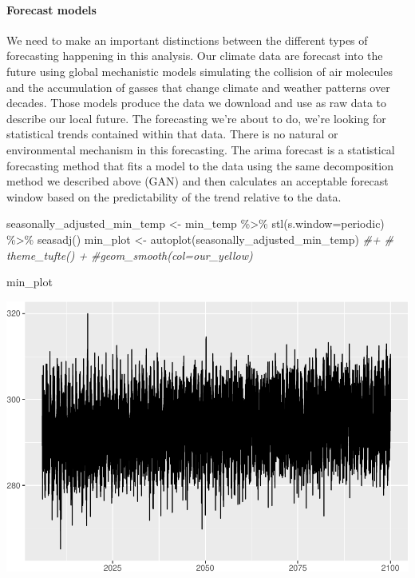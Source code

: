 \documentclass[
  paper=a4,
  ,captions=tableheading
]{scrartcl}
\newenvironment{Shaded}{\begin{snugshade}}{\end{snugshade}}
\newcommand{\AttributeTok}[1]{\textcolor[rgb]{0.77,0.63,0.00}{#1}}
\newcommand{\CommentTok}[1]{\textcolor[rgb]{0.56,0.35,0.01}{\textit{#1}}}
\newcommand{\FunctionTok}[1]{\textcolor[rgb]{0.00,0.00,0.00}{#1}}
\newcommand{\NormalTok}[1]{#1}
\newcommand{\OtherTok}[1]{\textcolor[rgb]{0.56,0.35,0.01}{#1}}
\newcommand{\SpecialCharTok}[1]{\textcolor[rgb]{0.00,0.00,0.00}{#1}}
\newcommand{\StringTok}[1]{\textcolor[rgb]{0.31,0.60,0.02}{#1}}
\begin{document}
\hypertarget{forecast-models}{%
\paragraph{Forecast models}\label{forecast-models}}

We need to make an important distinctions between the different types of
forecasting happening in this analysis. Our climate data are forecast
into the future using global mechanistic models simulating the collision
of air molecules and the accumulation of gasses that change climate and
weather patterns over decades. Those models produce the data we download
and use as raw data to describe our local future. The forecasting we're
about to do, we're looking for statistical trends contained within that
data. There is no natural or environmental mechanism in this
forecasting. The arima forecast is a statistical forecasting method that
fits a model to the data using the same decomposition method we
described above (GAN) and then calculates an acceptable forecast window
based on the predictability of the trend relative to the data.

\begin{Shaded}
\begin{Highlighting}[]
\NormalTok{seasonally\_adjusted\_min\_temp }\OtherTok{\textless{}{-}}\NormalTok{ min\_temp }\SpecialCharTok{\%\textgreater{}\%} \FunctionTok{stl}\NormalTok{(}\AttributeTok{s.window=}\StringTok{\textquotesingle{}periodic\textquotesingle{}}\NormalTok{) }\SpecialCharTok{\%\textgreater{}\%} \FunctionTok{seasadj}\NormalTok{() }
\NormalTok{min\_plot }\OtherTok{\textless{}{-}} \FunctionTok{autoplot}\NormalTok{(seasonally\_adjusted\_min\_temp) }
\CommentTok{\#+ }
 \CommentTok{\# theme\_tufte() + }
  \CommentTok{\#geom\_smooth(col=our\_yellow)}

\NormalTok{min\_plot}
\end{Highlighting}
\end{Shaded}

\includegraphics{Haskell_files/figure-latex/unnamed-chunk-58-1.pdf}
\end{document}
